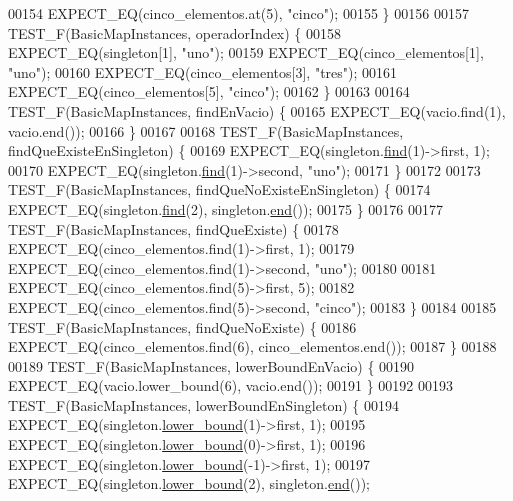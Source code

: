 \begin{DoxyCode}
00154     EXPECT\_EQ(cinco\_elementos.at(5), \textcolor{stringliteral}{"cinco"});
00155 \}
00156 
00157 TEST\_F(BasicMapInstances, operadorIndex) \{
00158     EXPECT\_EQ(singleton[1], \textcolor{stringliteral}{"uno"});
00159     EXPECT\_EQ(cinco\_elementos[1], \textcolor{stringliteral}{"uno"});
00160     EXPECT\_EQ(cinco\_elementos[3], \textcolor{stringliteral}{"tres"});
00161     EXPECT\_EQ(cinco\_elementos[5], \textcolor{stringliteral}{"cinco"});
00162 \}
00163 
00164 TEST\_F(BasicMapInstances, findEnVacio) \{
00165     EXPECT\_EQ(vacio.find(1), vacio.end());
00166 \}
00167 
00168 TEST\_F(BasicMapInstances, findQueExisteEnSingleton) \{
00169     EXPECT\_EQ(singleton.\hyperlink{classaed2_1_1map_afd0fc1a8234888e61e0e615de7e245b8_afd0fc1a8234888e61e0e615de7e245b8}{find}(1)->first, 1);
00170     EXPECT\_EQ(singleton.\hyperlink{classaed2_1_1map_afd0fc1a8234888e61e0e615de7e245b8_afd0fc1a8234888e61e0e615de7e245b8}{find}(1)->second, \textcolor{stringliteral}{"uno"});
00171 \}
00172 
00173 TEST\_F(BasicMapInstances, findQueNoExisteEnSingleton) \{
00174     EXPECT\_EQ(singleton.\hyperlink{classaed2_1_1map_afd0fc1a8234888e61e0e615de7e245b8_afd0fc1a8234888e61e0e615de7e245b8}{find}(2), singleton.\hyperlink{classaed2_1_1map_a76023e6a56cb625513e1b5ea028bf983_a76023e6a56cb625513e1b5ea028bf983}{end}());
00175 \}
00176 
00177 TEST\_F(BasicMapInstances, findQueExiste) \{
00178     EXPECT\_EQ(cinco\_elementos.find(1)->first, 1);
00179     EXPECT\_EQ(cinco\_elementos.find(1)->second, \textcolor{stringliteral}{"uno"});
00180 
00181     EXPECT\_EQ(cinco\_elementos.find(5)->first, 5);
00182     EXPECT\_EQ(cinco\_elementos.find(5)->second, \textcolor{stringliteral}{"cinco"});
00183 \}
00184 
00185 TEST\_F(BasicMapInstances, findQueNoExiste) \{
00186     EXPECT\_EQ(cinco\_elementos.find(6), cinco\_elementos.end());
00187 \}
00188 
00189 TEST\_F(BasicMapInstances, lowerBoundEnVacio) \{
00190     EXPECT\_EQ(vacio.lower\_bound(6), vacio.end());
00191 \}
00192 
00193 TEST\_F(BasicMapInstances, lowerBoundEnSingleton) \{
00194     EXPECT\_EQ(singleton.\hyperlink{classaed2_1_1map_a62075a47afdf89267c5462f88164af3d_a62075a47afdf89267c5462f88164af3d}{lower\_bound}(1)->first, 1);
00195     EXPECT\_EQ(singleton.\hyperlink{classaed2_1_1map_a62075a47afdf89267c5462f88164af3d_a62075a47afdf89267c5462f88164af3d}{lower\_bound}(0)->first, 1);
00196     EXPECT\_EQ(singleton.\hyperlink{classaed2_1_1map_a62075a47afdf89267c5462f88164af3d_a62075a47afdf89267c5462f88164af3d}{lower\_bound}(-1)->first, 1);
00197     EXPECT\_EQ(singleton.\hyperlink{classaed2_1_1map_a62075a47afdf89267c5462f88164af3d_a62075a47afdf89267c5462f88164af3d}{lower\_bound}(2), singleton.\hyperlink{classaed2_1_1map_a76023e6a56cb625513e1b5ea028bf983_a76023e6a56cb625513e1b5ea028bf983}{end}());

\end{DoxyCode}
